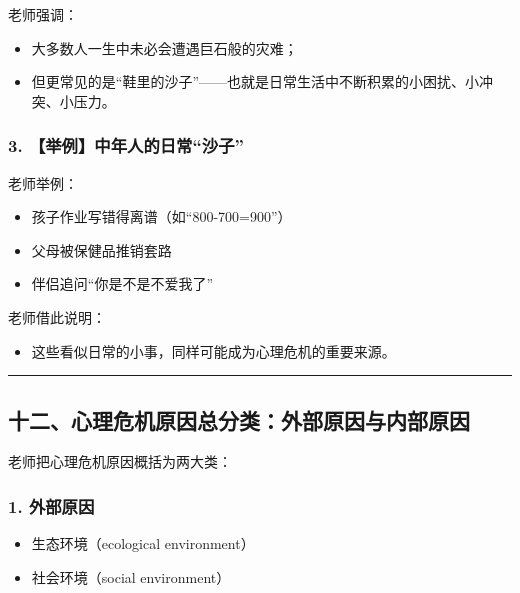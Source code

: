 \documentclass[
  chinese,
  9pt,
  a4paper,
]{ctexart}
\providecommand{\tightlist}{%
  \setlength{\itemsep}{0pt}\setlength{\parskip}{0pt}}
\begin{document}
老师强调：

\begin{itemize}
\tightlist
\item
  大多数人一生中未必会遭遇巨石般的灾难；
\item
  但更常见的是``鞋里的沙子''------也就是日常生活中不断积累的小困扰、小冲突、小压力。
\end{itemize}

\subsubsection{3.
【举例】中年人的日常``沙子''}\label{ux4e3eux4f8bux4e2dux5e74ux4ebaux7684ux65e5ux5e38ux6c99ux5b50}

老师举例：

\begin{itemize}
\tightlist
\item
  孩子作业写错得离谱（如``800-700=900''）
\item
  父母被保健品推销套路
\item
  伴侣追问``你是不是不爱我了''
\end{itemize}

老师借此说明：

\begin{itemize}
\tightlist
\item
  这些看似日常的小事，同样可能成为心理危机的重要来源。
\end{itemize}

\begin{center}\rule{0.5\linewidth}{0.5pt}\end{center}

\subsection{十二、心理危机原因总分类：外部原因与内部原因}\label{ux5341ux4e8cux5fc3ux7406ux5371ux673aux539fux56e0ux603bux5206ux7c7bux5916ux90e8ux539fux56e0ux4e0eux5185ux90e8ux539fux56e0}

老师把心理危机原因概括为两大类：

\subsubsection{1. 外部原因}\label{ux5916ux90e8ux539fux56e0}

\begin{itemize}
\tightlist
\item
  生态环境（ecological environment）
\item
  社会环境（social environment）
\end{itemize}
\end{document}
